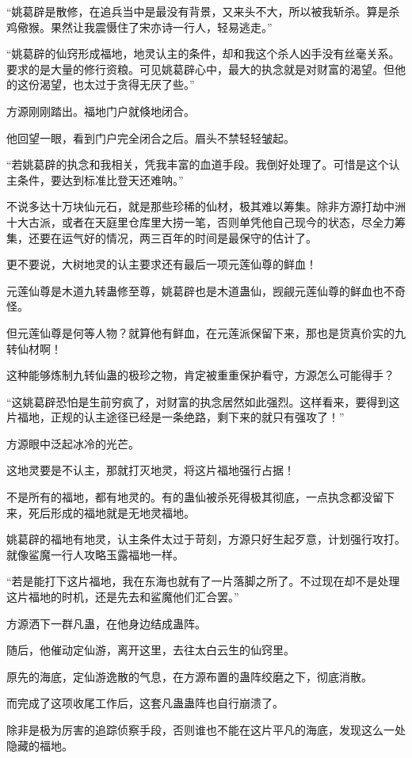 \begin{this_body}
“姚葛辟是散修，在追兵当中是最没有背景，又来头不大，所以被我斩杀。算是杀鸡儆猴。果然让我震慑住了宋亦诗一行人，轻易逃走。”

“姚葛辟的仙窍形成福地，地灵认主的条件，却和我这个杀人凶手没有丝毫关系。要求的是大量的修行资粮。可见姚葛辟心中，最大的执念就是对财富的渴望。但他的这份渴望，也太过于贪得无厌了些。”

方源刚刚踏出。福地门户就倏地闭合。

他回望一眼，看到门户完全闭合之后。眉头不禁轻轻皱起。

“若姚葛辟的执念和我相关，凭我丰富的血道手段。我倒好处理了。可惜是这个认主条件，要达到标准比登天还难呐。”

不说多达十万块仙元石，就是那些珍稀的仙材，极其难以筹集。除非方源打劫中洲十大古派，或者在天庭里仓库里大捞一笔，否则单凭他自己现今的状态，尽全力筹集，还要在运气好的情况，两三百年的时间是最保守的估计了。

更不要说，大树地灵的认主要求还有最后一项元莲仙尊的鲜血！

元莲仙尊是木道九转蛊修至尊，姚葛辟也是木道蛊仙，觊觎元莲仙尊的鲜血也不奇怪。

但元莲仙尊是何等人物？就算他有鲜血，在元莲派保留下来，那也是货真价实的九转仙材啊！

这种能够炼制九转仙蛊的极珍之物，肯定被重重保护看守，方源怎么可能得手？

“这姚葛辟恐怕是生前穷疯了，对财富的执念居然如此强烈。这样看来，要得到这片福地，正规的认主途径已经是一条绝路，剩下来的就只有强攻了！”

方源眼中泛起冰冷的光芒。

这地灵要是不认主，那就打灭地灵，将这片福地强行占据！

不是所有的福地，都有地灵的。有的蛊仙被杀死得极其彻底，一点执念都没留下来，死后形成的福地就是无地灵福地。

姚葛辟的福地有地灵，认主条件太过于苛刻，方源只好生起歹意，计划强行攻打。就像鲨魔一行人攻略玉露福地一样。

“若是能打下这片福地，我在东海也就有了一片落脚之所了。不过现在却不是处理这片福地的时机，还是先去和鲨魔他们汇合罢。”

方源洒下一群凡蛊，在他身边结成蛊阵。

随后，他催动定仙游，离开这里，去往太白云生的仙窍里。

原先的海底，定仙游逸散的气息，在方源布置的蛊阵绞磨之下，彻底消散。

而完成了这项收尾工作后，这套凡蛊蛊阵也自行崩溃了。

除非是极为厉害的追踪侦察手段，否则谁也不能在这片平凡的海底，发现这么一处隐藏的福地。


\end{this_body}
